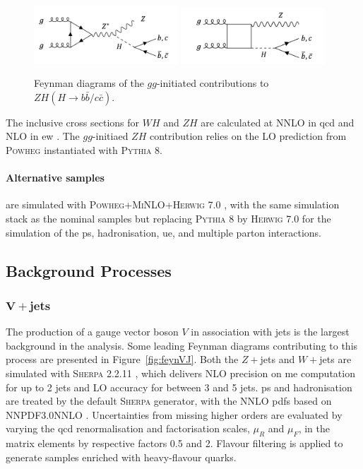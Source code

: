 \begin{figure}[h!]
  \center
  \includegraphics[width=0.48\textwidth]{Images/VH/Feynman/vh2order.png}
  \includegraphics[width=0.48\textwidth]{Images/VH/Feynman/vh3order.png}
  \caption{Feynman diagrams of the $gg$-initiated contributions to $ZH(H\rightarrow b\bar{b}/c\bar{c})$.} 
  \label{fig:feynnloVH}
\end{figure}

The inclusive cross sections for $WH$ and $ZH$ are calculated at NNLO in \gls{qcd} \cite{BREIN2004149} and NLO in \gls{ew} \cite{PDFLHCrun2}. The $gg$-initiaed $ZH$ contribution relies on the LO prediction from \textsc{Powheg} instantiated with \textsc{Pythia} 8.

\paragraph{Alternative samples} are simulated with \textsc{Powheg}+\textsc{MiNLO}+\textsc{Herwig} 7.0 \cite{bellm2017herwig}, with the same simulation stack as the nominal samples but replacing \textsc{Pythia} 8 by \textsc{Herwig} 7.0 for the simulation of the \gls{ps}, hadronisation, \gls{ue}, and multiple parton interactions.

\subsection{Background Processes}
\subsubsection{$\boldsymbol{V+}$jets}
The production of a gauge vector boson $V$ in association with jets is the largest background in the analysis. Some leading Feynman diagrams contributing to this process are presented in Figure~\ref{fig:feynVJ}. Both the $Z+$jets and $W+$jets are simulated with \textsc{Sherpa} 2.2.11 \cite{10.21468/SciPostPhys.7.3.034}, which delivers NLO precision on \gls{me} computation for up to 2 jets and LO accuracy for between 3 and 5 jets. \gls{ps} and hadronisation are treated by the default \textsc{Sherpa} generator, with the NNLO \glspl{pdf} based on NNPDF3.0NNLO \cite{PDFLHCrun2}. Uncertainties from missing higher orders are evaluated by varying the \gls{qcd} renormalisation and factorisation scales, $\mu_R$ and $\mu_F$, in the matrix elements by respective factors 0.5 and 2. Flavour filtering is applied to generate samples enriched with heavy-flavour quarks.

